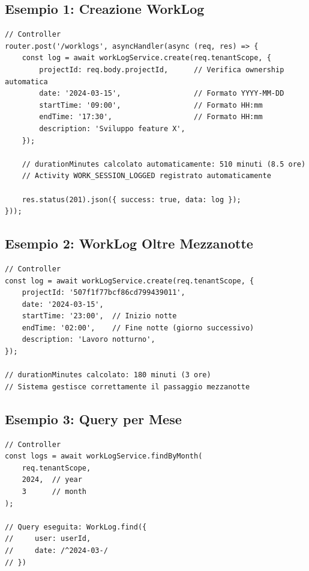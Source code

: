 \documentclass[11pt,a4paper]{article}
\begin{document}
\subsection{Esempio 1: Creazione WorkLog}

\begin{lstlisting}
// Controller
router.post('/worklogs', asyncHandler(async (req, res) => {
    const log = await workLogService.create(req.tenantScope, {
        projectId: req.body.projectId,      // Verifica ownership automatica
        date: '2024-03-15',                 // Formato YYYY-MM-DD
        startTime: '09:00',                 // Formato HH:mm
        endTime: '17:30',                   // Formato HH:mm
        description: 'Sviluppo feature X',
    });
    
    // durationMinutes calcolato automaticamente: 510 minuti (8.5 ore)
    // Activity WORK_SESSION_LOGGED registrato automaticamente
    
    res.status(201).json({ success: true, data: log });
}));
\end{lstlisting}

\subsection{Esempio 2: WorkLog Oltre Mezzanotte}

\begin{lstlisting}
// Controller
const log = await workLogService.create(req.tenantScope, {
    projectId: '507f1f77bcf86cd799439011',
    date: '2024-03-15',
    startTime: '23:00',  // Inizio notte
    endTime: '02:00',    // Fine notte (giorno successivo)
    description: 'Lavoro notturno',
});

// durationMinutes calcolato: 180 minuti (3 ore)
// Sistema gestisce correttamente il passaggio mezzanotte
\end{lstlisting}

\subsection{Esempio 3: Query per Mese}

\begin{lstlisting}
// Controller
const logs = await workLogService.findByMonth(
    req.tenantScope,
    2024,  // year
    3      // month
);

// Query eseguita: WorkLog.find({ 
//     user: userId, 
//     date: /^2024-03-/ 
// })
\end{lstlisting}
\end{document}
